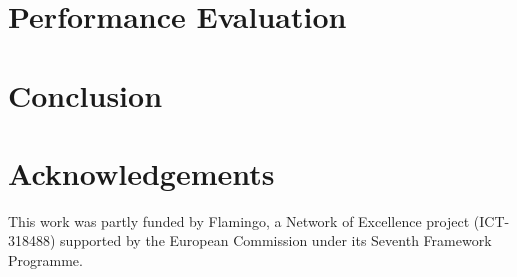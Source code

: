 \documentclass[10pt, conference]{IEEEtran}
\begin{document}
\section{Performance Evaluation}
\label{sec:evaluation}
\section{Conclusion}
\label{sec:conclusion}
\section*{Acknowledgements}
This work was partly funded by Flamingo, a Network of Excellence
project (ICT-318488) supported by the European Commission under its
Seventh Framework Programme.






\end{document}
